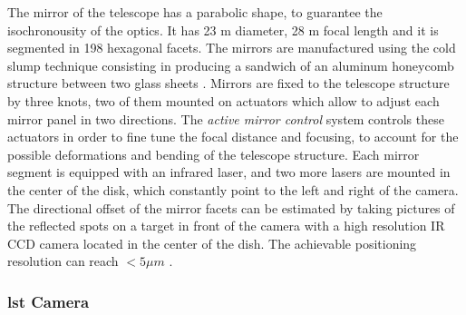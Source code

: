 \documentclass[main.tex]{subfiles}
\begin{document}
  The mirror of the telescope has a parabolic shape, to guarantee the isochronousity of the optics. It has 23 m diameter, 28 m focal length and it is segmented in 198 hexagonal facets. The mirrors are manufactured using the cold slump technique consisting in producing a sandwich of an aluminum honeycomb structure between two glass sheets \cite{2017LST}.
Mirrors are fixed to the telescope structure by three knots, two of them mounted on actuators which allow to adjust each mirror panel in two directions. The \textit{active mirror control} system controls these actuators in order to fine tune the focal distance and focusing, to account for the possible deformations and bending of the telescope structure. Each mirror segment is equipped with an infrared laser, and two more lasers are mounted in the center of the disk, which constantly point to the left and right of the camera. The directional offset of the mirror facets can be estimated by taking pictures of the reflected spots on a target in front of the camera with a high resolution IR CCD camera located in the center of the dish. The achievable positioning resolution can reach $< 5 \mu m$ \cite{2013LST}.
  
  \subsubsection{\gls{lst} Camera}
\end{document}
